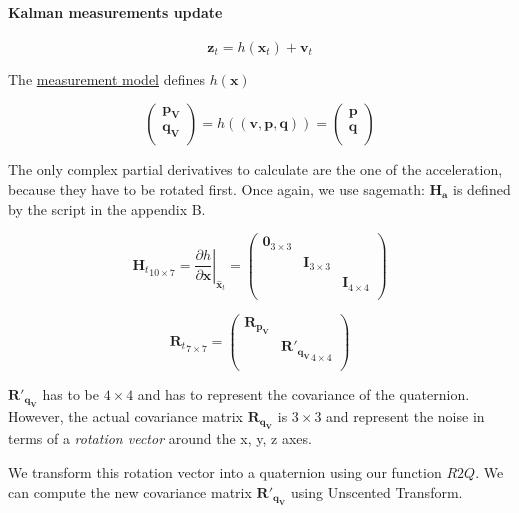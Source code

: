 \documentclass[12pt,]{article}
\let\savedparagraph\paragraph %
\let\paragraph\oldparagraph %
\let\paragraph\savedparagraph %
\let\oldparagraph\paragraph
\renewcommand{\paragraph}[1]{\oldparagraph{#1}\mbox{}}
\begin{document}
\paragraph{Kalman measurements update}\label{kalman-measurements-update}

\[\mathbf{z}_t = h(\mathbf{x}_t) + \mathbf{v}_t\]

The \protect\hyperlink{measurements-model}{measurement model} defines
\(h(\mathbf{x})\)

\[\left( \begin{array}{c}
\mathbf{p_V}\\
\mathbf{q_V}\\
\end{array} \right) = h((\mathbf{v}, \mathbf{p}, \mathbf{q})) = \left( \begin{array}{c}
\mathbf{p}\\
\mathbf{q}\\
\end{array} \right)\]

The only complex partial derivatives to calculate are the one of the
acceleration, because they have to be rotated first. Once again, we use
sagemath: \(\mathbf{H_a}\) is defined by the script in the appendix B.

\[{\mathbf{H}_t}_{10 \times 7} = \left . \frac{\partial h}{\partial \mathbf{x} } \right \vert _{\hat{\mathbf{x}}_{t}} = \left( \begin{array}{ccc}
\mathbf{0}_{3 \times 3} & & \\
& \mathbf{I}_{3 \times 3} & \\
& & \mathbf{I}_{4 \times 4}\\
\end{array} \right)\]

\[{\mathbf{R}_t}_{7 \times 7} = 
\left( \begin{array}{cc}
\mathbf{R}_{\mathbf{p_V}} & \\
&  {\mathbf{R}'_{\mathbf{q_V}}}_{4 \times 4}\\
\end{array} \right)\]

\(\mathbf{R}'_{\mathbf{q_V}}\) has to be \(4 \times 4\) and has to
represent the covariance of the quaternion. However, the actual
covariance matrix \(\mathbf{R}_{\mathbf{q_V}}\) is \(3 \times 3\) and
represent the noise in terms of a \emph{rotation vector} around the x,
y, z axes.

We transform this rotation vector into a quaternion using our function
\(R2Q\). We can compute the new covariance matrix
\(\mathbf{R}'_{\mathbf{q_V}}\) using Unscented Transform.
\end{document}
